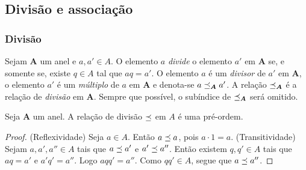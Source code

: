 \subsection{Divisão e associação}

\subsubsection{Divisão}


\begin{definition}
Sejam $\bm A$ um anel e $a,a' \in A$. O elemento $a$ \emph{divide} o elemento $a'$ em $\bm A$ se, e somente se, existe $q \in A$ tal que $aq=a'$. O elemento $a$ é um \emph{divisor} de $a'$ em $\bm A$, o elemento $a'$ é um \emph{múltiplo} de $a$ em $\bm A$ e denota-se $a \preceq_{\bm A} a'$. A relação $\preceq_{\bm A}$ é a relação de \emph{divisão} em $\bm A$. Sempre que possível, o subíndice de $\preceq_{\bm A}$ será omitido.
\end{definition}

\begin{proposition}
Seja $\bm A$ um anel. A relação de divisão $\preceq$ em $A$ é uma pré-ordem.
\end{proposition}
\begin{proof}
(Reflexividade) Seja $a \in A$. Então $a \preceq a$, pois $a \cdot 1 = a$. (Transitividade) Sejam $a,a',a'' \in A$ tais que $a \preceq a'$ e $a' \preceq a''$. Então existem $q,q' \in A$ tais que $aq=a'$ e $a'q'=a''$. Logo $aqq'=a''$. Como $qq' \in A$, segue que $a \preceq a''$.
\end{proof}

